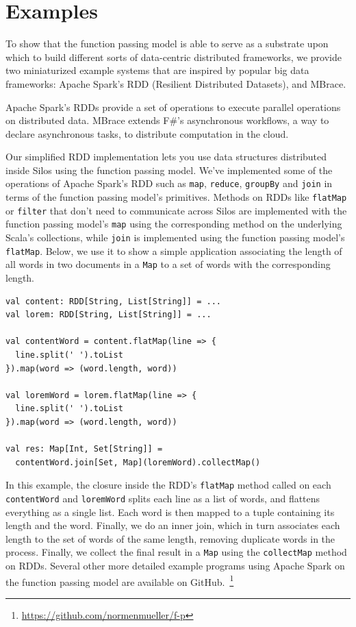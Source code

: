 \documentclass{jfp1}
\begin{document}
\section{Examples}
\label{sec:examples}

To show that the function passing model is able to serve as a substrate upon
which to build different sorts of data-centric distributed frameworks, we
provide two miniaturized example systems that are inspired by popular big data
frameworks: Apache Spark's RDD (Resilient Distributed Datasets), and MBrace.

Apache Spark's RDDs provide a set of operations to execute parallel operations
on distributed data. MBrace extends F\#'s asynchronous workflows, a way to
declare asynchronous tasks, to distribute computation in the cloud.

Our simplified RDD implementation lets you use data structures distributed
inside Silos using the function passing model. We've implemented some of the
operations of Apache Spark’s RDD such as \verb|map|, \verb|reduce|,
\verb|groupBy| and \verb|join| in terms of the function passing model's
primitives. Methods on RDDs like \verb|flatMap| or \verb|filter| that don’t need
to communicate across Silos are implemented with the function passing model’s
\verb|map| using the corresponding method on the underlying Scala’s collections,
while \verb|join| is implemented using the function passing model’s
\verb|flatMap|. Below, we use it to show a simple application associating the
length of all words in two documents in a \verb|Map| to a set of words with the
corresponding length.

\begin{lstlisting}
val content: RDD[String, List[String]] = ...
val lorem: RDD[String, List[String]] = ...

val contentWord = content.flatMap(line => {
  line.split(' ').toList
}).map(word => (word.length, word))

val loremWord = lorem.flatMap(line => {
  line.split(' ').toList
}).map(word => (word.length, word))

val res: Map[Int, Set[String]] =
  contentWord.join[Set, Map](loremWord).collectMap()
\end{lstlisting}

In this example, the closure inside the RDD's \verb|flatMap| method called on
each \verb|contentWord| and \verb|loremWord| splits each line as a list of
words, and flattens everything as a single list. Each word is then mapped to a
tuple containing its length and the word. Finally, we do an inner join, which in
turn associates each length to the set of words of the same length, removing
duplicate words in the process. Finally, we collect the final result in a
\verb|Map| using the \verb|collectMap| method on RDDs. Several other more
detailed example programs using Apache Spark on the function passing model are
available on GitHub.~\footnote{\url{https://github.com/normenmueller/f-p}}
\end{document}
